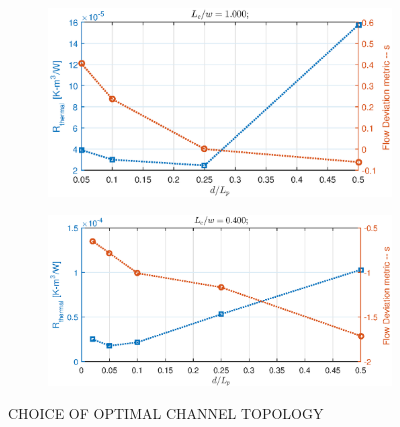 \documentclass[twocolumn,10pt,cleanfoot]{ihmtc}
\begin{document}
\begin{figure}
\centering
   \begin{subfigure}[b]{0.55\textwidth}
   \includegraphics[width=0.85\linewidth]{optgeo_a.eps}
   \caption{}
   \label{optgeo_a} 
\end{subfigure}
%
   \begin{subfigure}[b]{0.55\textwidth}
   \includegraphics[width=0.85\linewidth]{optgeo_b.eps}
   \caption{}
   \label{optgeo_b} 
\end{subfigure}
%
%
%
\vspace{-2em}
\caption{CHOICE OF OPTIMAL CHANNEL TOPOLOGY}
\vspace{-3.5em}
\end{figure}
%
%
\end{document}
